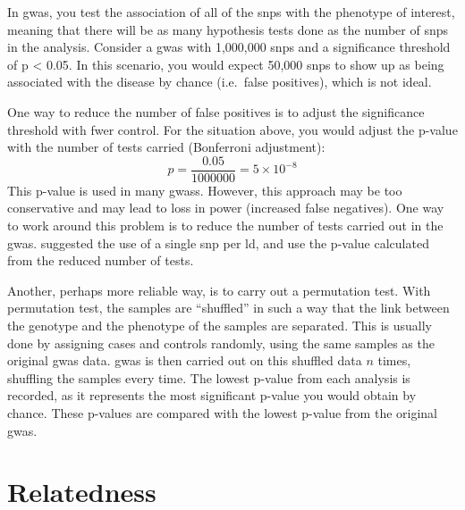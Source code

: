 In \gls{gwas}, you test the association of all of the \glspl{snp} with the phenotype of interest, meaning that there will be as many hypothesis tests done as the number of \glspl{snp} in the analysis.
Consider a \gls{gwas} with 1,000,000 \glspl{snp} and a significance threshold of p < 0.05.
In this scenario, you would expect 50,000 \glspl{snp} to show up as being associated with the disease by chance (i.e.\ false positives), which is not ideal.

One way to reduce the number of false positives is to adjust the significance threshold with \gls{fwer} control.
For the situation above, you would adjust the p-value with the number of tests carried (Bonferroni adjustment):
\begin{equation*}
	p = \frac{0.05}{1000000} = 5\times10^{-8}
\end{equation*}
This p-value is used in many \glspl{gwas}.
However, this approach may be too conservative and may lead to loss in power (increased false negatives).
One way to work around this problem is to reduce the number of tests carried out in the \gls{gwas}.
\citet{Duggal2008} suggested the use of a single \gls{snp} per \gls{ld}, and use the p-value calculated from the reduced number of tests.

Another, perhaps more reliable way, is to carry out a permutation test.
With permutation test, the samples are ``shuffled'' in such a way that the link between the genotype and the phenotype of the samples are separated.
This is usually done by assigning cases and controls randomly, using the same samples as the original \gls{gwas} data.
\gls{gwas} is then carried out on this shuffled data $n$ times, shuffling the samples every time.
The lowest p-value from each analysis is recorded, as it represents the most significant p-value you would obtain by chance.
These p-values are compared with the lowest p-value from the original \gls{gwas}.










\section{Relatedness}
\label{sec:relatedness}


